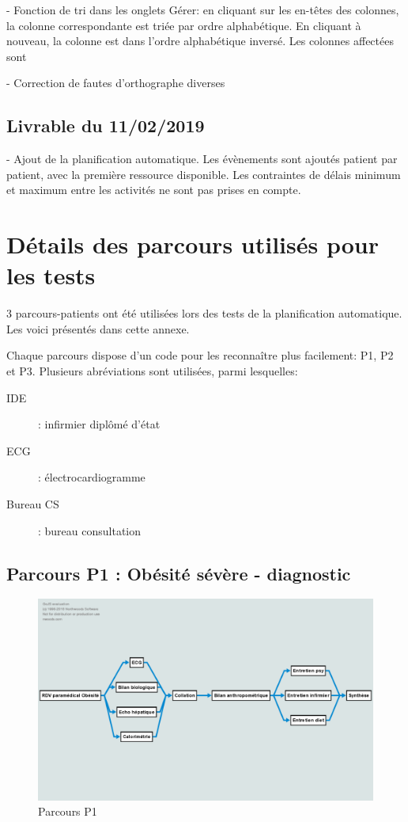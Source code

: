 \documentclass[noposter]{polytech/polytech}
\begin{document}
- Fonction de tri dans les onglets Gérer: en cliquant sur les en-têtes des colonnes, la colonne correspondante est triée par ordre alphabétique. En cliquant à nouveau, la colonne est dans l'ordre alphabétique inversé. Les colonnes affectées sont 

- Correction de fautes d'orthographe diverses

\section{Livrable du 11/02/2019}

- Ajout de la planification automatique. Les évènements sont ajoutés patient par patient, avec la première ressource disponible. Les contraintes de délais minimum et maximum entre les activités ne sont pas prises en compte.


\chapter{Détails des parcours utilisés pour les tests}
\label{ann:parcours}

3 parcours-patients ont été utilisées lors des tests de la planification automatique. Les voici présentés dans cette annexe. 

Chaque parcours dispose d'un code pour les reconnaître plus facilement: P1, P2 et P3. Plusieurs abréviations sont utilisées, parmi lesquelles:

\begin{description}
	\item[IDE] : infirmier diplômé d'état
	\item[ECG] : électrocardiogramme
	\item[Bureau CS] : bureau consultation
\end{description}


\section{Parcours P1 : Obésité sévère - diagnostic}

\begin{figure}
	\includegraphics[scale=0.35]{images/parcoursP1}
	\caption{Parcours P1}
	\label{fig:P1}
\end{figure}
\end{document}
